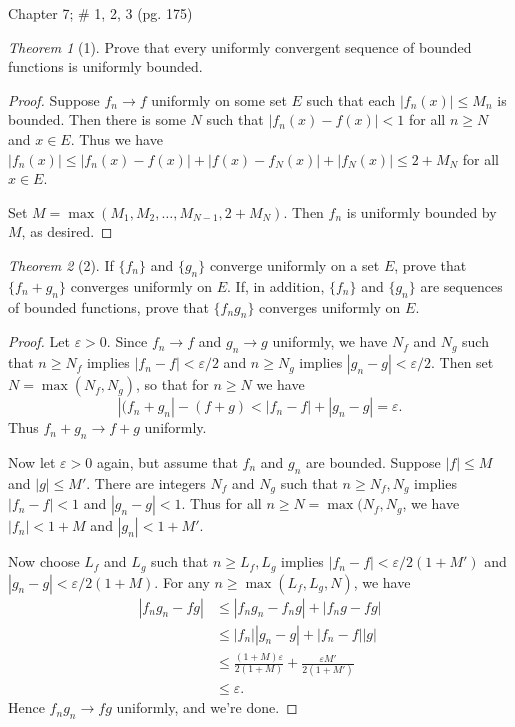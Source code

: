 \documentclass[12pt]{article}
\theoremstyle{remark}
\theoremstyle{named}
\newtheorem*{theorem}{Theorem}
\newcommand{\e}{\varepsilon}
\newcommand{\abs}[1]{|#1|}
\begin{document}
Chapter 7; \# 1, 2, 3 (pg. 175)

\begin{theorem}[1]
    Prove that every uniformly convergent sequence of bounded functions is uniformly bounded. 
\end{theorem}

\begin{proof}
    Suppose \(f_n \to f\) uniformly on some set \(E\) such that each \(\abs{f_n(x)} \le M_n\) is bounded. Then there is some \(N\) such that \(\abs{f_n(x) - f(x)} < 1\) for all \(n \ge N\) and \(x \in E\). Thus we have \(\abs{f_n(x)} \le \abs{f_n(x) - f(x)} + \abs{f(x) - f_N(x)} + \abs{f_N(x)} \le 2 + M_N\) for all \(x \in E\). 

    Set \(M = \max(M_1, M_2, \dots, M_{N - 1}, 2 + M_N)\). Then \(f_n\) is uniformly bounded by \(M\), as desired. 
\end{proof}

\begin{theorem}[2]
    If \(\{f_n\}\) and \(\{g_n\}\) converge uniformly on a set \(E\), prove that \(\{f_n + g_n\}\) converges uniformly on \(E\). If, in addition, \(\{f_n\}\) and \(\{g_n\}\) are sequences of bounded functions, prove that \(\{f_ng_n\}\) converges uniformly on \(E\). 
\end{theorem}

\begin{proof}
    Let \(\e > 0\). Since \(f_n \to f\) and \(g_n \to g\) uniformly, we have \(N_f\) and \(N_g\) such that \(n \ge N_f\) implies \(\abs{f_n - f} < \e / 2\) and \(n \ge N_g\) implies \(\abs{g_n - g} < \e / 2\). Then set \(N = \max(N_f, N_g)\), so that for \(n \ge N\) we have \[\abs{(f_n + g_n} - (f + g) < \abs{f_n - f} + \abs{g_n - g} = \e.\]
    Thus \(f_n + g_n \to f + g\) uniformly.

    Now let \(\e > 0\) again, but assume that \(f_n\) and \(g_n\) are bounded. Suppose \(\abs{f} \le M\) and \(\abs{g} \le M'\). There are integers \(N_f\) and \(N_g\) such that \(n \ge N_f, N_g\) implies \(\abs{f_n - f} < 1\) and \(\abs{g_n - g} < 1\). Thus for all \(n \ge N = \max(N_f, N_g\), we have \(\abs{f_n} < 1 + M\) and \(\abs{g_n} < 1 + M'\).

    Now choose \(L_f\) and \(L_g\) such that \(n \ge L_f, L_g\) implies \(\abs{f_n - f} < \e / 2(1 + M')\) and \(\abs{g_n - g} < \e / 2(1 + M)\). For any \(n \ge \max(L_f, L_g, N)\), we have 
    \begin{align*}
        \abs{f_ng_n - fg} &\le \abs{f_n g_n - f_n g} + \abs{f_n g - fg} \\
        &\le \abs{f_n}\abs{g_n - g} + \abs{f_n - f} \abs{g} \\
        &\le \frac{(1 + M)\e}{2(1 + M)} + \frac{\e M'}{2(1 + M')} \\
        &\le \e.
    \end{align*}
    Hence \(f_n g_n \to fg\) uniformly, and we're done.
\end{proof}
\end{document}
